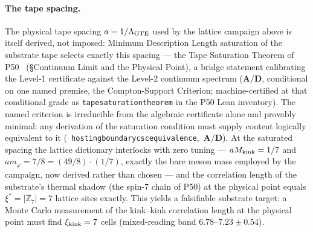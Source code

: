 \documentclass[11pt]{article}
\theoremstyle{remark}
\newcommand{\ZS}{\mathbb{Z}_7}
\newcommand{\lean}[1]{%
  \penalty-100
  \begingroup\def\_{\textunderscore\allowbreak}\texttt{#1}\endgroup}
\newcommand{\CatAD}{\textbf{A/D}}
\begin{document}
\paragraph{The tape spacing.}
The physical tape spacing $a = 1/\Lambda_{\rm GTE}$ used by the lattice
campaign above is itself derived, not imposed: Minimum Description Length
saturation of the substrate tape selects exactly this spacing --- the Tape
Saturation Theorem of P50~\cite{SpivackSpin7Lattice} (\S{}Continuum Limit
and the Physical Point), a bridge statement calibrating the Level-1
certificate against the Level-2 continuum spectrum ($\CatAD$, conditional
on one named premise, the Compton-Support Criterion; machine-certified at
that conditional grade as \lean{tape\_saturation\_theorem} in the P50 Lean
inventory).  The named criterion is irreducible from the algebraic
certificate alone and provably minimal: any derivation of the saturation
condition must supply content logically equivalent to it
\mbox{(\lean{hosting\_boundary\_csc\_equivalence}, $\CatAD$)}.  At the
saturated spacing the lattice dictionary interlocks with zero tuning ---
$a M_{\rm kink} = 1/7$ and $a m_\varphi = 7/8 = (49/8)\cdot(1/7)$, exactly
the bare meson mass employed by the campaign, now derived rather than
chosen --- and the correlation length of the substrate's thermal shadow
(the spin-7 chain of P50) at the physical point equals
$\xi^\ast = |\ZS| = 7$ lattice sites exactly.  This yields a falsifiable
substrate target: a Monte Carlo measurement of the kink--kink correlation
length at the physical point must find $\xi_{\rm kink} = 7$ cells
(mixed-reading band $6.78$--$7.23 \pm 0.54$).
\end{document}

